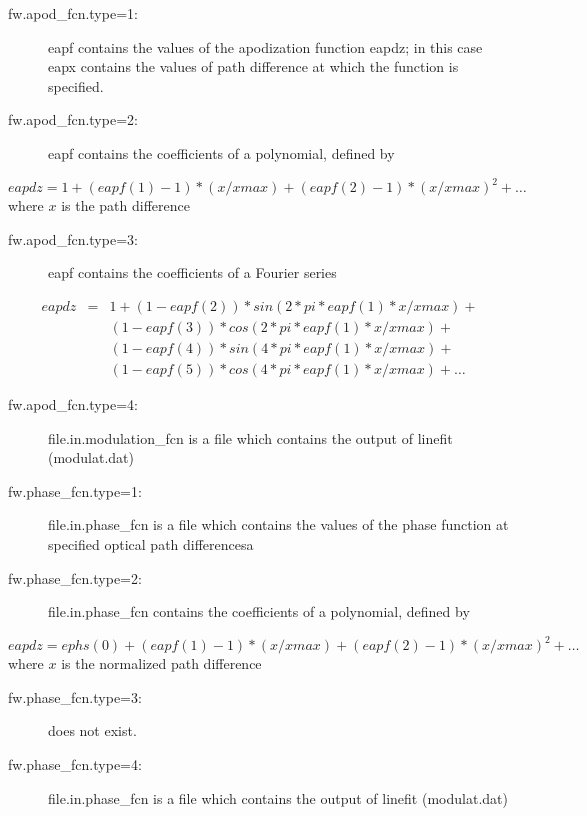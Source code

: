 \documentclass[a4paper]{article}
\begin{document}
\begin{description}
\item [fw.apod\_fcn.type=1:] eapf contains the values of the apodization function eapdz; 
  in this case eapx contains the values of path difference at 
  which the function is specified.
\item[fw.apod\_fcn.type=2:] eapf contains the coefficients of a polynomial, defined
  by
\end{description}
\begin{equation}
  eapdz = 1 + (eapf(1)-1)*(x/xmax) + (eapf(2)-1)*(x/xmax)^2 + \ldots
\end{equation}
where $x$ is the path difference
\begin{description}
\item [fw.apod\_fcn.type=3:] eapf contains the coefficients of a Fourier series
\end{description}
\begin{eqnarray}
  eapdz &=& 1 + (1-eapf(2))*sin(2*pi*eapf(1)*x/xmax) +\\
        &&(1-eapf(3))*cos(2*pi*eapf(1)*x/xmax) +\\
        &&(1-eapf(4))*sin(4*pi*eapf(1)*x/xmax) +\\
        &&(1-eapf(5))*cos(4*pi*eapf(1)*x/xmax) +\ldots    
\end{eqnarray}
\begin{description}
\item [fw.apod\_fcn.type=4:] file.in.modulation\_fcn is a file which contains the output of linefit (modulat.dat)
\end{description}


\begin{description}
\item [fw.phase\_fcn.type=1:] file.in.phase\_fcn is a file which contains the values of the phase function at specified optical path differencesa 
\item[fw.phase\_fcn.type=2:]  file.in.phase\_fcn contains the coefficients of a polynomial, defined
  by
\end{description}
\begin{equation}
  eapdz = ephs(0) + (eapf(1)-1)*(x/xmax) + (eapf(2)-1)*(x/xmax)^2 + \ldots
\end{equation}
where $x$ is the normalized path difference
\begin{description}
\item [fw.phase\_fcn.type=3:] does not exist.
\item [fw.phase\_fcn.type=4:] file.in.phase\_fcn is a file which contains the output of linefit (modulat.dat)
\end{description}
\end{document}
